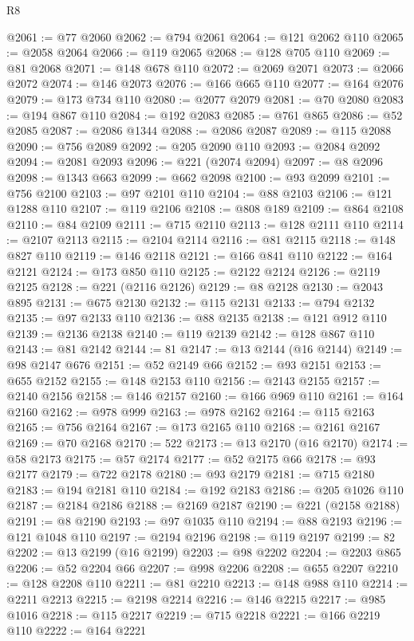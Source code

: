 \begin{lexlean}{R8}
\begin{coremodule}
@2061 := @77 @2060
@2062 := @794 @2061
@2064 := @121 @2062 @110
@2065 := @2058 @2064
@2066 := @119 @2065
@2068 := @128 @705 @110
@2069 := @81 @2068
@2071 := @148 @678 @110
@2072 := @2069 @2071
@2073 := @2066 @2072
@2074 := @146 @2073
@2076 := @166 @665 @110
@2077 := @164 @2076
@2079 := @173 @734 @110
@2080 := @2077 @2079
@2081 := @70 @2080
@2083 := @194 @867 @110
@2084 := @192 @2083
@2085 := @761 @865
@2086 := @52 @2085
@2087 := @2086 @1344
@2088 := @2086 @2087
@2089 := @115 @2088
@2090 := @756 @2089
@2092 := @205 @2090 @110
@2093 := @2084 @2092
@2094 := @2081 @2093
@2096 := @221 (@2074 @2094)
@2097 := @8 @2096
@2098 := @1343 @663
@2099 := @662 @2098
@2100 := @93 @2099
@2101 := @756 @2100
@2103 := @97 @2101 @110
@2104 := @88 @2103
@2106 := @121 @1288 @110
@2107 := @119 @2106
@2108 := @808 @189
@2109 := @864 @2108
@2110 := @84 @2109
@2111 := @715 @2110
@2113 := @128 @2111 @110
@2114 := @2107 @2113
@2115 := @2104 @2114
@2116 := @81 @2115
@2118 := @148 @827 @110
@2119 := @146 @2118
@2121 := @166 @841 @110
@2122 := @164 @2121
@2124 := @173 @850 @110
@2125 := @2122 @2124
@2126 := @2119 @2125
@2128 := @221 (@2116 @2126)
@2129 := @8 @2128
@2130 := @2043 @895
@2131 := @675 @2130
@2132 := @115 @2131
@2133 := @794 @2132
@2135 := @97 @2133 @110
@2136 := @88 @2135
@2138 := @121 @912 @110
@2139 := @2136 @2138
@2140 := @119 @2139
@2142 := @128 @867 @110
@2143 := @81 @2142
@2144 := 81
@2147 := @13 @2144 (@16 @2144)
@2149 := @98 @2147 @676
@2151 := @52 @2149 @66
@2152 := @93 @2151
@2153 := @655 @2152
@2155 := @148 @2153 @110
@2156 := @2143 @2155
@2157 := @2140 @2156
@2158 := @146 @2157
@2160 := @166 @969 @110
@2161 := @164 @2160
@2162 := @978 @999
@2163 := @978 @2162
@2164 := @115 @2163
@2165 := @756 @2164
@2167 := @173 @2165 @110
@2168 := @2161 @2167
@2169 := @70 @2168
@2170 := 522
@2173 := @13 @2170 (@16 @2170)
@2174 := @58 @2173
@2175 := @57 @2174
@2177 := @52 @2175 @66
@2178 := @93 @2177
@2179 := @722 @2178
@2180 := @93 @2179
@2181 := @715 @2180
@2183 := @194 @2181 @110
@2184 := @192 @2183
@2186 := @205 @1026 @110
@2187 := @2184 @2186
@2188 := @2169 @2187
@2190 := @221 (@2158 @2188)
@2191 := @8 @2190
@2193 := @97 @1035 @110
@2194 := @88 @2193
@2196 := @121 @1048 @110
@2197 := @2194 @2196
@2198 := @119 @2197
@2199 := 82
@2202 := @13 @2199 (@16 @2199)
@2203 := @98 @2202
@2204 := @2203 @865
@2206 := @52 @2204 @66
@2207 := @998 @2206
@2208 := @655 @2207
@2210 := @128 @2208 @110
@2211 := @81 @2210
@2213 := @148 @988 @110
@2214 := @2211 @2213
@2215 := @2198 @2214
@2216 := @146 @2215
@2217 := @985 @1016
@2218 := @115 @2217
@2219 := @715 @2218
@2221 := @166 @2219 @110
@2222 := @164 @2221

\end{coremodule}
\end{lexlean}
